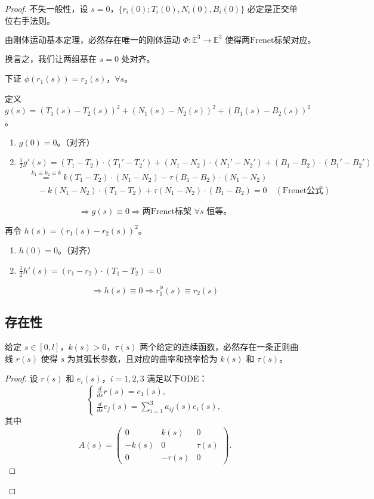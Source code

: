 \documentclass[lang=cn,10pt,thmcnt=section]{elegantbook}
\begin{document}
\begin{proof}
不失一般性，设 $s = 0$，$\{r_i(0); T_i(0), N_i(0), B_i(0)\}$ 必定是正交单位右手法则。

\[
\text{由刚体运动基本定理，必然存在唯一的刚体运动 } \Phi: \mathbb{E}^3 \to \mathbb{E}^3 \text{ 使得两Frenet标架对应。}
\]

换言之，我们让两组基在 $s = 0$ 处对齐。

下证 $\phi(r_1(s)) = r_2(s)$，$\forall s$。

定义 $g(s) = (T_1(s) - T_2(s))^2 + (N_1(s) - N_2(s))^2 + (B_1(s) - B_2(s))^2$。
\begin{enumerate}
    \item $g(0) = 0$。（对齐）
    \item $\frac{1}{2}g'(s) = (T_1 - T_2) \cdot (T_1' - T_2') + (N_1 - N_2) \cdot (N_1' - N_2') + (B_1 - B_2) \cdot (B_1' - B_2')$
    \begin{align*}
    &\stackrel{k_1 \equiv k_2 \equiv k}{=} k(T_1 - T_2) \cdot (N_1 - N_2) - \tau(B_1 - B_2) \cdot (N_1 - N_2) \\
    &\quad -k(N_1 - N_2) \cdot (T_1 - T_2) + \tau(N_1 - N_2) \cdot (B_1 - B_2) = 0 \quad (\text{Frenet公式})
    \end{align*}
\end{enumerate}

\[
\Rightarrow g(s) \equiv 0\Rightarrow \text{两Frenet标架 $\forall s$ 恒等。}
\]


再令 $h(s) = (r_1(s) - r_2(s))^2$。

\begin{enumerate}
    \item $h(0) = 0$。（对齐）
    \item $\frac{1}{2}h'(s) = (r_1 - r_2) \cdot (T_1 - T_2) = 0$
\end{enumerate}

\[
\Rightarrow h(s) \equiv 0 \Rightarrow r_1^{\phi}(s) \equiv r_2(s)
\]
\subsection{存在性}
\begin{theorem}
    给定 $s \in [0, l]$，$k(s) > 0$，$\tau(s)$ 两个给定的连续函数，必然存在一条正则曲线 $r(s)$ 使得 $s$ 为其弧长参数，且对应的曲率和挠率恰为 $k(s)$ 和 $\tau(s)$。
    \end{theorem}
    
    \begin{proof}
    设 $r(s)$ 和 $e_i(s)$，$i = 1, 2, 3$ 满足以下ODE：
    \[
    \begin{cases}
    \displaystyle \frac{d}{ds} r(s) = e_1(s), \\
    \displaystyle \frac{d}{ds} e_j(s) = \sum_{i=1}^3 a_{ij}(s) e_i(s),
    \end{cases}
    \]
    其中
    \[
    A(s) = \begin{pmatrix}
    0 & k(s) & 0 \\
    -k(s) & 0 & \tau(s) \\
    0 & -\tau(s) & 0
    \end{pmatrix}.
    \]
    

\end{proof}
\end{proof}
\end{document}
